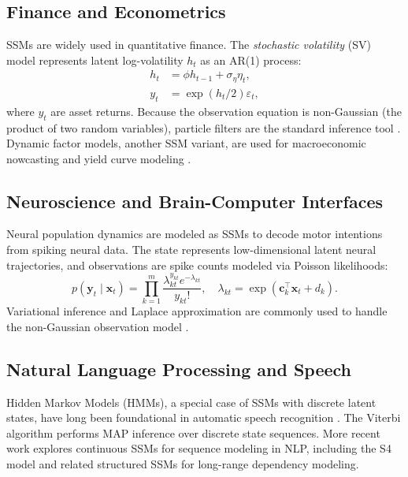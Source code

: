 \documentclass[conference]{IEEEtran}
\begin{document}
\subsection{Finance and Econometrics}

SSMs are widely used in quantitative finance. The \emph{stochastic volatility} (SV) model represents latent log-volatility $h_t$ as an AR(1) process:
\begin{align}
h_t &= \phi h_{t-1} + \sigma_\eta \eta_t, \\
y_t &= \exp(h_t/2) \varepsilon_t,
\end{align}
where $y_t$ are asset returns. Because the observation equation is non-Gaussian (the product of two random variables), particle filters are the standard inference tool \cite{kim1998stochastic}. Dynamic factor models, another SSM variant, are used for macroeconomic nowcasting and yield curve modeling \cite{stock2002forecasting}.

\subsection{Neuroscience and Brain-Computer Interfaces}

Neural population dynamics are modeled as SSMs to decode motor intentions from spiking neural data. The state represents low-dimensional latent neural trajectories, and observations are spike counts modeled via Poisson likelihoods:
\begin{equation}
p(\mathbf{y}_t \mid \mathbf{x}_t) = \prod_{k=1}^{m} \frac{\lambda_{kt}^{y_{kt}} e^{-\lambda_{kt}}}{y_{kt}!}, \quad \lambda_{kt} = \exp(\mathbf{c}_k^\top \mathbf{x}_t + d_k).
\end{equation}
Variational inference and Laplace approximation are commonly used to handle the non-Gaussian observation model \cite{macke2011empirical,yu2009gaussian}.

\subsection{Natural Language Processing and Speech}

Hidden Markov Models (HMMs), a special case of SSMs with discrete latent states, have long been foundational in automatic speech recognition \cite{rabiner1989tutorial}. The Viterbi algorithm performs MAP inference over discrete state sequences. More recent work explores continuous SSMs for sequence modeling in NLP, including the S4 model \cite{gu2021efficiently} and related structured SSMs for long-range dependency modeling.
\end{document}
